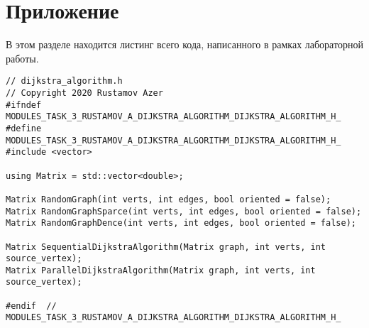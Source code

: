 \documentclass{report}
\begin{document}
\section*{Приложение}
В этом разделе находится листинг всего кода, написанного в рамках лабораторной работы.
\begin{lstlisting}
// dijkstra_algorithm.h
// Copyright 2020 Rustamov Azer
#ifndef MODULES_TASK_3_RUSTAMOV_A_DIJKSTRA_ALGORITHM_DIJKSTRA_ALGORITHM_H_
#define MODULES_TASK_3_RUSTAMOV_A_DIJKSTRA_ALGORITHM_DIJKSTRA_ALGORITHM_H_
#include <vector>

using Matrix = std::vector<double>;

Matrix RandomGraph(int verts, int edges, bool oriented = false);
Matrix RandomGraphSparce(int verts, int edges, bool oriented = false);
Matrix RandomGraphDence(int verts, int edges, bool oriented = false);

Matrix SequentialDijkstraAlgorithm(Matrix graph, int verts, int source_vertex);
Matrix ParallelDijkstraAlgorithm(Matrix graph, int verts, int source_vertex);

#endif  // MODULES_TASK_3_RUSTAMOV_A_DIJKSTRA_ALGORITHM_DIJKSTRA_ALGORITHM_H_
\end{lstlisting}
\end{document}
